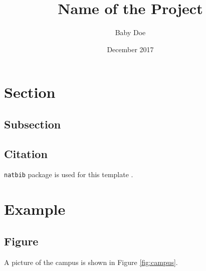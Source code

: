 \documentclass[12pt]{article}
\title{Name of the Project}
\author{Baby Doe}
\date{December 2017}
\begin{document}
\maketitle

\setcounter{tocdepth}{2}
\tableofcontents
\thispagestyle{empty}
\newpage
\listoffigures
\listoftables
\thispagestyle{empty}

\newpage
 \setcounter{page}{1}
\begin{abstract}
    \lipsum[1]
\end{abstract}

\begin{acknowledgement}
    \lipsum[2]
\end{acknowledgement}

\newpage
\section{Section}

\subsection{Subsection}
\lipsum[3]

\subsection{Citation}
\verb|natbib| package is used for this template \citep{BARRES2013275}.

\section{Example}
\subsection{Figure}

A picture of the campus is shown in Figure \ref{fig:campus}.
\end{document}
